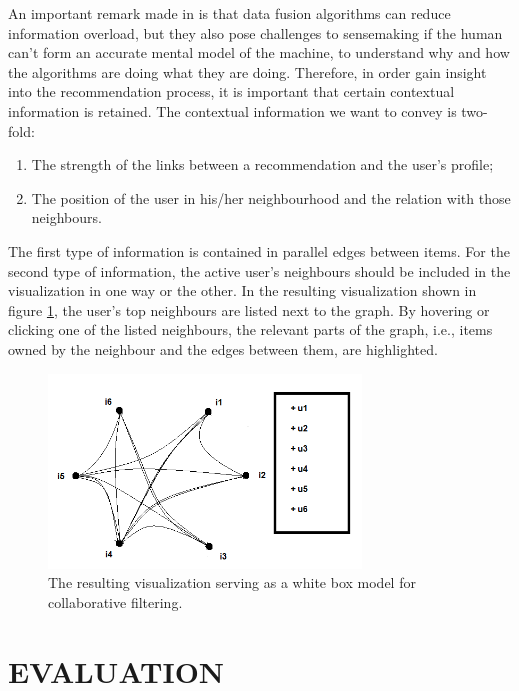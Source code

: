 \documentclass[a4paper,10pt,twocolumn]{article}
\begin{document}
An important remark made in \cite{Klein:2006:MSS:1158821.1159015} is that data fusion algorithms can reduce information overload, but they also pose challenges to sensemaking if the human can't form an accurate mental model of the machine, to understand why and how the algorithms are doing what they are doing. Therefore, in order gain insight into the recommendation process, it is important that certain contextual information is retained. The contextual information we want to convey is two-fold:

\begin{enumerate}
	\item The strength of the links between a recommendation and the user's profile;
	\item The position of the user in his/her neighbourhood and the relation with those neighbours.
\end{enumerate}

The first type of information is contained in parallel edges between items. For the second type of information, the active user's neighbours should be included in the visualization in one way or the other. In the resulting visualization shown in figure \ref{fig:whitebox_model}, the user's top neighbours are listed next to the graph. By hovering or clicking one of the listed neighbours, the relevant parts of the graph, i.e., items owned by the neighbour and the edges between them, are highlighted.

\begin{figure}
	\includegraphics[width=8.3cm]{img/whitebox_model}
	\caption{The resulting visualization serving as a white box model for collaborative filtering.}
	\label{fig:whitebox_model}
\end{figure}


\section{EVALUATION}\label{section:evaluation}
\end{document}
